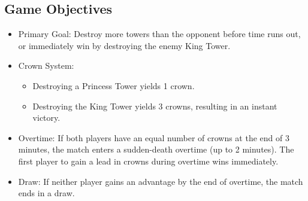 \documentclass{article}
\begin{document}
\subsection{Game Objectives}
\begin{itemize}
    \item Primary Goal: Destroy more towers than the opponent before time runs out, or immediately win by destroying the enemy King Tower.
    \item Crown System:
    \begin{itemize}
        \item Destroying a Princess Tower yields 1 crown.
        \item Destroying the King Tower yields 3 crowns, resulting in an instant victory.
    \end{itemize}
    \item Overtime: If both players have an equal number of crowns at the end of 3 minutes, the match enters a sudden-death overtime (up to 2 minutes). The first player to gain a lead in crowns during overtime wins immediately.
    \item Draw: If neither player gains an advantage by the end of overtime, the match ends in a draw.
\end{itemize}
\end{document}
